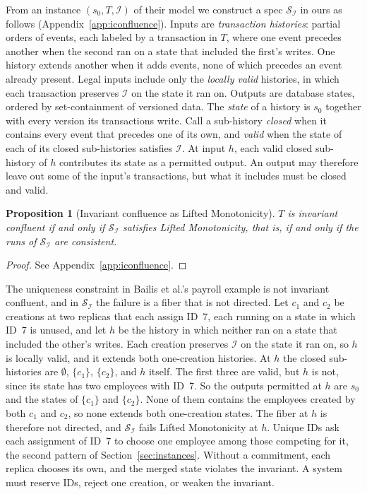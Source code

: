 \documentclass[sigconf]{cidr-2027}
\newtheorem{proposition}{Proposition}
\theoremstyle{remark}
\newcommand{\commitment}{commitment\xspace}
\newcommand{\inrel}{extends\xspace}          %
\newcommand{\outrel}{extends\xspace}          %
\newcommand{\Spec}{\mathcal{S}}
\begin{document}
From an instance $(s_0,T,\mathcal I)$ of their model we construct a
spec $\Spec_{\mathcal I}$ in ours as follows (Appendix~\ref{app:iconfluence}). Inputs are \emph{transaction histories}: partial orders of events, each
labeled by a transaction in $T$, where one event precedes another when the
second ran on a state that included the first's writes. \textcolor{reviewed}{One history \inrel
another when it adds events, none of which precedes an event already present.} \textcolor{reviewed}{Legal inputs include only the \emph{locally valid} histories, in which each
transaction preserves $\mathcal I$ on the state it ran on.} \textcolor{reviewed}{Outputs are
database states, ordered by set-containment of versioned data.} \textcolor{reviewed}{The
\emph{state} of a history is $s_0$ together with every version its
transactions write.} \textcolor{reviewed}{Call a sub-history \emph{closed} when it contains every
event that precedes one of its own, and \emph{valid} when the state of each of
its closed sub-histories satisfies $\mathcal I$.} \textcolor{reviewed}{At input $h$, each valid
closed sub-history of $h$ contributes its state as a permitted output.} \textcolor{reviewed}{An
output may therefore leave out some of the input's transactions, but what it
includes must be closed and valid.}

\begin{proposition}[Invariant confluence as Lifted Monotonicity]
\label{prop:iconfluence-lm}
\textcolor{reviewed}{$T$ is invariant confluent if and only if $\Spec_{\mathcal I}$ satisfies Lifted
Monotonicity, that is, if and only if the runs of $\Spec_{\mathcal I}$ are consistent.}
\end{proposition}

\begin{proof}
See Appendix~\ref{app:iconfluence}.
\end{proof}

The uniqueness constraint in Bailis et al.'s payroll example is not invariant
confluent, and in $\Spec_{\mathcal I}$ the failure is a fiber that is not
directed. Let $c_1$ and $c_2$ be creations at two replicas that each assign
ID~7, each running on a state in which ID~7 is unused, and let $h$ be the
history in which neither ran on a state that included the other's writes. Each creation preserves $\mathcal I$ on the state it ran on, so $h$ is locally
valid, and it \inrel both one-creation histories. At $h$ the closed
sub-histories are $\emptyset$, $\{c_1\}$, $\{c_2\}$, and $h$ itself. The first
three are valid, but $h$ is not, since its state has two employees with ID~7. So the outputs permitted at $h$ are $s_0$ and the states of $\{c_1\}$ and
$\{c_2\}$. None of them contains the employees created by both $c_1$ and
$c_2$, so none \outrel both one-creation states. The fiber at $h$ is therefore
not directed, and $\Spec_{\mathcal I}$ fails Lifted Monotonicity at $h$. \textcolor{reviewed}{Unique IDs
ask each assignment of ID~7 to choose one employee among those competing for
it, the second pattern of Section~\ref{sec:instances}.} \textcolor{reviewed}{Without a
\commitment, each replica chooses its own, and the merged state violates the
invariant.} A
system must reserve IDs, reject one creation, or weaken the invariant.
\end{document}
